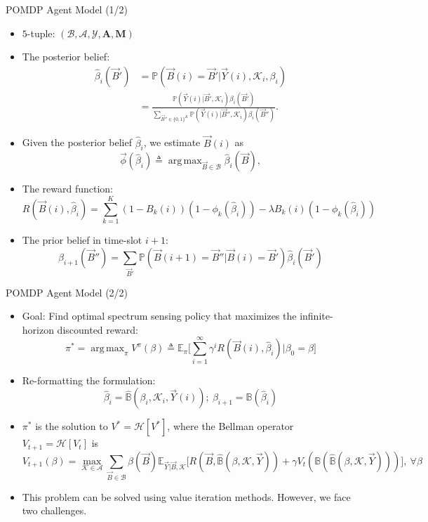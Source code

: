 \documentclass{beamer}
\DeclareMathOperator*{\argmax}{arg\,max}
\begin{document}
\begin{frame}{POMDP Agent Model (1/2)}
    \footnotesize{\begin{itemize}
        \item $5$-tuple: $(\mathcal B,\mathcal{A},\mathcal{Y},\mathbf{A},\mathbf{M})$
        \item The posterior belief:
        \begin{align*}
            \hat\beta_i(\vec{B}') &= \mathbb{P}(\vec{B}(i) = \vec{B}'|\vec{Y}(i), \mathcal K_i, \beta_i)\\&=
            \frac{\mathbb{P}(\vec{Y}(i)|\vec{B}', \mathcal{K}_i) \beta_i(\vec{B}')}{
            \sum_{\vec{B}'' {\in} \{0,1\}^K} \mathbb{P}(\vec{Y}(i)|\vec{B}'', \mathcal{K}_i) \beta_i(\vec{B}'')}.
        \end{align*}
        \item Given the posterior belief $\hat{\beta}_i$, we estimate $\vec{B}(i)$ as 
        $$
        \vec{\phi}(\hat{\beta}_{i})\triangleq \argmax_{\vec{B} {\in} \mathcal{B}} \hat{\beta}_{i}(\vec{B}),
        $$
        \item The reward function:
        \begin{equation}
            \nonumber
                R(\vec{B}(i), \hat{\beta}_i){=}\sum_{k=1}^{K} (1{-}B_k(i))(1{-}\phi_k(\hat{\beta}_{i})){-}\lambda B_k(i)(1 - \phi_k(\hat{\beta}_i))
        \end{equation}
        \item The prior belief in time-slot $i+1$:
        \[\beta_{i+1}(\vec{B}'')=\sum_{\vec{B}'}\mathbb{P}(\vec{B}(i+1) = \vec{B}''|\vec{B}(i)=\vec{B}')\hat{\beta}_{i}(\vec{B}')\]
    \end{itemize}}
\end{frame}
\begin{frame}{POMDP Agent Model (2/2)}
    \footnotesize{\begin{itemize}
        \item Goal: Find optimal spectrum sensing policy that maximizes the infinite-horizon discounted reward:
        \[\pi^{*}{=}\argmax_{\pi} V^{\pi}(\beta) \triangleq \mathbb{E}_{\pi} \Big[\sum_{i=1}^{\infty} \gamma^{i} R(\vec{B}(i), \hat{\beta}_i)|\beta_0 {=}\beta\Big]\]
        \item Re-formatting the formulation:
        \[\hat\beta_i{=}\hat{\mathbb B}(\beta_i, \mathcal K_i, \vec{Y}(i));\ \beta_{i+1}{=}{\mathbb B}(\hat\beta_i)\]
        \item $\pi^{*}$ is the solution to $V^*{=}\mathcal{H}[V^*]$, where the Bellman operator $V_{t+1}{=}\mathcal {H}[V_{t}]$ is
        \[V_{t+1}(\beta) = \max_{\mathcal{K} {\in} \mathcal{A}} \sum_{\vec{B} {\in} \mathcal{B}} \beta(\vec{B}) \mathbb{E}_{\vec{Y}|\vec{B}, \mathcal{K}} \Big[R(\vec{B}, \hat{\mathbb{B}}(\beta, \mathcal{K}, \vec{Y}))+\gamma V_{t}(\mathbb{B}(\hat{\mathbb{B}}(\beta, \mathcal{K}, \vec{Y})))\Big],\ \forall \beta\]
        \item This problem can be solved using value iteration methods. However, we face two challenges.
    \end{itemize}}
\end{frame}
\end{document}
